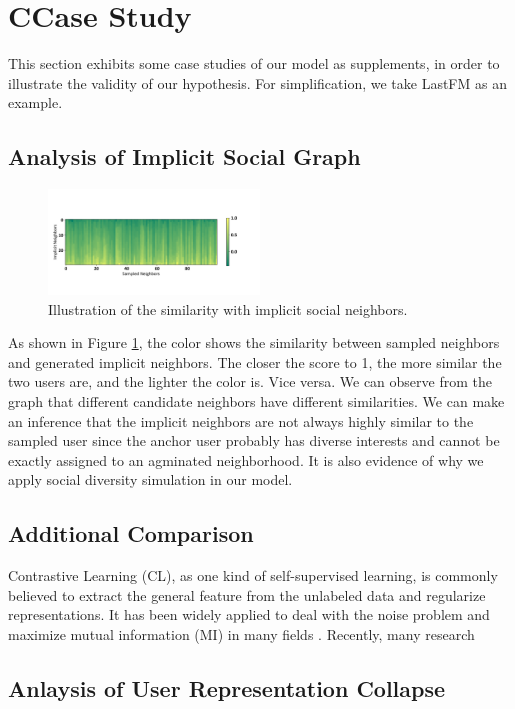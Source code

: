 \documentclass[letterpaper]{article} %
\begin{document}
\section{C{\quad}Case Study}
This section exhibits some case studies of our model as supplements, in order to illustrate the validity of our hypothesis. For simplification, we take LastFM as an example. 
\subsection{Analysis of Implicit Social Graph}
\begin{figure}[ht!]
  \centering
  \includegraphics[width=0.5\textwidth]{implicit.pdf} %
  \caption{Illustration of the similarity with implicit social neighbors.}
  \label{fig_implicit}
\end{figure}
\noindent As shown in Figure \ref{fig_implicit}, the color shows the similarity between sampled neighbors and generated implicit neighbors. The closer the score to 1, the more similar the two users are, and the lighter the color is. Vice versa. We can observe from the graph that different candidate neighbors have different similarities. We can make an inference that the implicit neighbors are not always highly similar to the sampled user since the anchor user probably has diverse interests and cannot be exactly assigned to an agminated neighborhood. It is also evidence of why we apply social diversity simulation in our model.

\subsection{Additional Comparison}
Contrastive Learning (CL), as one kind of self-supervised learning, is commonly believed to extract the general feature from the unlabeled data and regularize representations. It has been widely applied to deal with the noise problem and maximize mutual information (MI) in many fields \cite{deepInfoMax,S4L,selfCL}. Recently, many research

\subsection{Anlaysis of User Representation Collapse}

\end{document}
